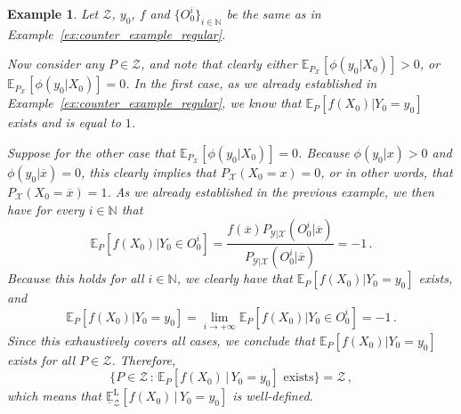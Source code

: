 \documentclass[3p]{elsarticle}
\newtheorem{example}{Example}[section]
\newcommand{\nats}{\mathbb{N}}
\newcommand{\states}{\mathcal{X}}
\newcommand{\observs}{\mathcal{Y}}
\begin{document}
\begin{example}
Let $\mathcal{Z}$, $y_0$, $f$ and $\{O_0^i\}_{i\in\nats}$ be the same as in Example~\ref{ex:counter_example_regular}.

Now consider any $P\in\mathcal{Z}$, and note that clearly either $\mathbb{E}_{P_\states}[\phi(y_0\vert X_0)]>0$, or $\mathbb{E}_{P_\states}[\phi(y_0\vert X_0)]=0$. In the first case, as we already established in Example~\ref{ex:counter_example_regular}, we know that $\mathbb{E}_P[f(X_0)\vert Y_0=y_0]$ exists and is equal to $1$.

Suppose for the other case that $\mathbb{E}_{P_\states}[\phi(y_0\vert X_0)]=0$. Because $\phi(y_0\vert x)>0$ and $\phi(y_0\vert \overline{x})=0$, this clearly implies that $P_\states(X_0=x)=0$, or in other words, that $P_\states(X_0=\overline{x})=1$. As we already established in the previous example, we then have for every $i\in\nats$ that
\begin{equation*}
\mathbb{E}_P[f(X_0)\vert Y_0\in O_0^i] = \frac{f(\overline{x})P_{\observs\vert\states}(O_0^i\vert \overline{x})}{P_{\observs\vert\states}(O_0^i\vert \overline{x})} = -1\,.
\end{equation*}
Because this holds for all $i\in\nats$, we clearly have that $\mathbb{E}_P[f(X_0)\vert Y_0 = y_0]$ exists, and
\begin{equation*}
\mathbb{E}_P[f(X_0)\vert Y_0=y_0] = \lim_{i\to+\infty} \mathbb{E}_P[f(X_0)\vert Y_0\in O_0^i] = -1\,.
\end{equation*}
Since this exhaustively covers all cases, we conclude that $\mathbb{E}_P[f(X_0)\vert Y_0=y_0]$ exists for all $P\in\mathcal{Z}$. Therefore,
\begin{equation*}
\{P\in\mathcal{Z}\,:\,\text{$\mathbb{E}_P[f(X_0)\,\vert\,Y_0=y_0]$ exists}\} = \mathcal{Z}\,,
\end{equation*}
which means that $\underline{\mathbb{E}}_\mathcal{Z}^\mathrm{L}[f(X_0)\,\vert\, Y_0=y_0]$ is well-defined.


\end{example}
\end{document}
